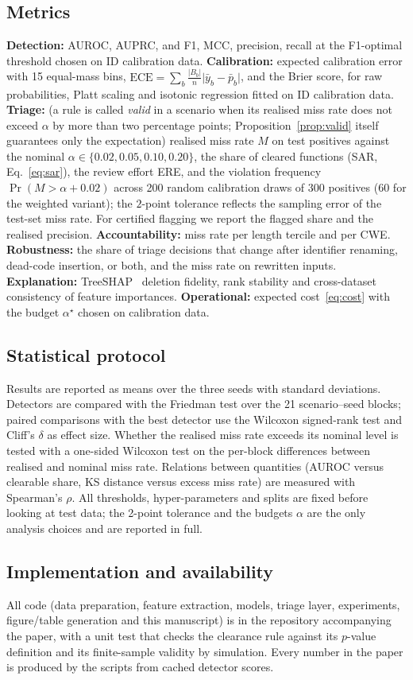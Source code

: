 \subsection{Metrics}
\textbf{Detection:} AUROC, AUPRC, and F1, MCC, precision, recall at the F1-optimal threshold chosen on ID calibration data.
\textbf{Calibration:} expected calibration error with 15 equal-mass bins, $\mathrm{ECE}=\sum_b\frac{|B_b|}{n}\lvert\bar y_b-\bar p_b\rvert$, and the Brier score, for raw probabilities, Platt scaling and isotonic regression fitted on ID calibration data.
\textbf{Triage:} (a rule is called \emph{valid} in a scenario when its realised miss rate does not exceed $\alpha$ by more than two percentage points; Proposition~\ref{prop:valid} itself guarantees only the expectation) realised miss rate $M$ on test positives against the nominal $\alpha\in\{0.02,0.05,0.10,0.20\}$, the share of cleared functions (SAR, Eq.~\eqref{eq:sar}), the review effort ERE, and the violation frequency $\Pr(M>\alpha+0.02)$ across 200 random calibration draws of 300 positives (60 for the weighted variant); the $2$-point tolerance reflects the sampling error of the test-set miss rate.
For certified flagging we report the flagged share and the realised precision.
\textbf{Accountability:} miss rate per length tercile and per CWE.
\textbf{Robustness:} the share of triage decisions that change after identifier renaming, dead-code insertion, or both, and the miss rate on rewritten inputs.
\textbf{Explanation:} TreeSHAP~\cite{lundberg2020treeshap} deletion fidelity, rank stability and cross-dataset consistency of feature importances.
\textbf{Operational:} expected cost~\eqref{eq:cost} with the budget $\alpha^\star$ chosen on calibration data.

\subsection{Statistical protocol}
Results are reported as means over the three seeds with standard deviations. Detectors are compared with the Friedman test over the 21 scenario--seed blocks; paired comparisons with the best detector use the Wilcoxon signed-rank test and Cliff's $\delta$ as effect size.
Whether the realised miss rate exceeds its nominal level is tested with a one-sided Wilcoxon test on the per-block differences between realised and nominal miss rate. Relations between quantities (AUROC versus clearable share, KS distance versus excess miss rate) are measured with Spearman's $\rho$. All thresholds, hyper-parameters and splits are fixed before looking at test data; the 2-point tolerance and the budgets $\alpha$ are the only analysis choices and are reported in full.

\subsection{Implementation and availability}
All code (data preparation, feature extraction, models, triage layer, experiments, figure/table generation and this manuscript) is in the repository accompanying the paper, with a unit test that checks the clearance rule against its $p$-value definition and its finite-sample validity by simulation. Every number in the paper is produced by the scripts from cached detector scores.
